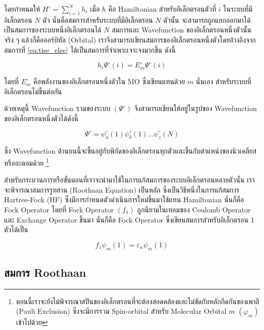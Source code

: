 โดยกำหนดให้ $H^{\circ} = \sum^{N}_{i=1} h_{i}$ เมื่อ $h$ คือ Hamiltonian สำหรับอิเล็กตรอนตัวที่ $i$ ในระบบที่มีอิเล็กตรอน
$N$ ตัว นั่นคือสมการสำหรับระบบที่มีอิเล็กตรอน $N$ ตัวนั้น จะสามารถถูกแยกออกมาได้เป็นสมการของระบบหนึ่งอิเล็กตรอนได้ $N$ สมการและ
Wavefunction ของอิเล็กตรอนหนึ่งตัวนั้นจริง ๆ แล้วก็คือออร์บิทัล (Orbital) เราจึงสามารถเขียนสมการของอิเล็กตรอนหนึ่งตัวโดยอ้างอิงจาก%
สมการที่ \eqref{eq:tise_elec} ได้เป็นสมการที่จำเพาะเจาะจงมากขึ้น ดังนี้

\begin{equation}\label{eq:tise_elec_i}
    h_{i} \Psi^{\circ}(i) = E^{\circ}_{m} \Psi^{\circ}(i)
\end{equation}

\noindent โดยที่ $E^{\circ}_{m}$ คือพลังงานของอิเล็กตรอนหนึ่งตัวใน MO ซึ่งเขียนแทนด้วย $m$ นั่นเอง สำหรับระบบที่อิเล็กตรอนไม่ขึ้นต่อกัน

ด้วยเหตุนี้ Wavefunction รวมของระบบ $(\Psi^{\circ})$ จึงสามารถเขียนให้อยู่ในรูปของ Wavefunction ของอิเล็กตรอนหนึ่งตัวได้ดังนี้

\begin{equation}
    \Psi^{\circ} = \psi^{\circ}_{a}(1) \psi^{\circ}_{b}(1) \dots \psi^{\circ}_{z}(N)
\end{equation}

\noindent ซึ่ง Wavefunction ด้านบนนี้จะขึ้นอยู่กับพิกัดของอิเล็กตรอนทุกตัวและขึ้นกับตำแหน่งของนิวเคลียสหรืออะตอมด้วย%
\footnote{ตอนนี้เราจะยังไม่พิจารณาสปินของอิเล็กตรอนที่จะต้องสอดคล้องและไม่ขัดกับหลักกีดกันของเพาลี (Pauli Exclusion)
    ซึ่งจะมีการรวม Spin-orbital สำหรับ Molecular Orbital $m$ $(\varphi_{m})$ เข้าไปด้วย}

สำหรับกระบวนการหรือขั้นตอนที่เราจะนำมาใช้ในการแก้สมการของระบบอิเล็กตรอนหลายตัวนั้น เราจะพิจารณาสมการรูทฮาน (Roothaan Equation)
เป็นหลัก ซึ่งเป็นวิธีหนึ่งในการแก้สมการ Hartree-Fock (HF) ซึ่งมีการกำหนดตัวดำเนินการใหม่ขึ้นมาใช้แทน Hamiltonian นั่นก็คือ Fock Operator
โดยที่ Fock Operator $(f_{1})$ ถูกนิยามในเทอมของ Coulomb Operator และ Exchange Operator ขึ้นมา นั่นก็คือ Fock Operator
ซึ่งเขียนสมการสำหรับอิเล็กตรอน 1 ตัวได้เป็น

\begin{equation}\label{eq:fock}
    f_{1} \psi_{m}(1) = \varepsilon_{n} \psi_{m}(1)
\end{equation}

\subsection{สมการ Roothaan}
\label{ssec:roothaan}


